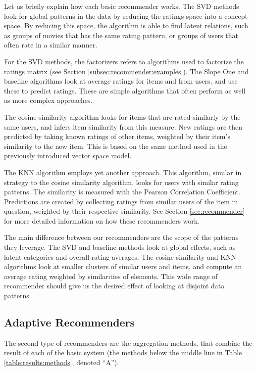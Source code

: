 Let us briefly explain how each basic recommender works.
The SVD methods look for global patterns in the data 
by reducing the ratings-space into a concept-space.
By reducing this space, the algorithm is able to find
latent relations, such as groups of movies that has the same
rating pattern, or groups of users that often rate in a similar manner.

For the SVD methods, the factorizers refers to algorithms used to factorize the ratings matrix
(see Section \ref{subsec:recommender:examples}).
The Slope One and baseline algorithms look at average
ratings for items and from users, and use these to predict ratings.
These are simple algorithms that often perform as well
as more complex approaches.

The cosine similarity algorithm looks for items that are rated
similarly by the same users, and infers item similarity from this measure.
New ratings are then predicted by taking known ratings of other items,
weighted by their item's similarity to the new item.
This is based on the same method used in the previously introduced vector space model.

The KNN algorithm employs yet another approach. This algorithm,
similar in strategy to the cosine similarity algorithm,
looks for users with similar rating patterns.
The similarity is measured with the Pearson Correlation Coefficient.
Predictions are created by collecting ratings from similar users
of the item in question, weighted by their respective similarity.
See Section \ref{sec:recommender} for more 
detailed information on how these recommenders work. 

The main difference between our recommenders are the scope of the patterns they leverage.
The SVD and baseline methods look at global effects, such as latent categories
and overall rating averages.
The cosine similarity and KNN algorithms look at smaller clusters of similar
users and items, and compute an average rating weighted by 
similarities of elements.
This wide range of recommender should give us the desired
effect of looking at disjoint data patterns.


\subsection{Adaptive Recommenders}

The second type of recommenders are the aggregation methods, 
that combine the result of each of the basic system
(the methods below the middle line in Table \ref{table:results:methods},
denoted ``A'').

